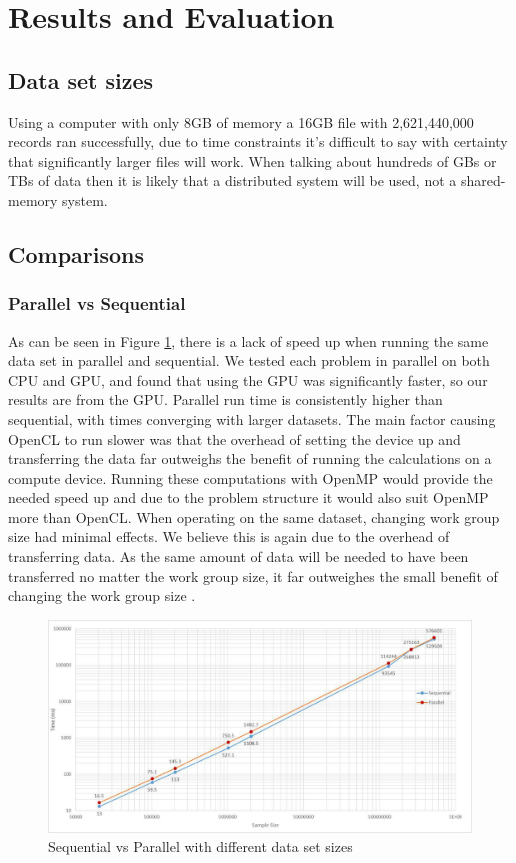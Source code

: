 
\section{Results and Evaluation}


\subsection{Data set sizes}
Using a computer with only 8GB of memory a 16GB file with 2,621,440,000 records ran successfully, due to time constraints it's difficult to say with certainty that significantly larger files will work. When talking about hundreds of GBs or TBs of data then it is likely that a distributed system will be used, not a shared-memory system.

\subsection{Comparisons}

\subsubsection{Parallel vs Sequential}
As can be seen in Figure \ref{speedup}, there is a lack of speed up when running the same data set in parallel and sequential. We tested each problem in parallel on both CPU and GPU, and found that using the GPU was significantly faster, so our results are from the GPU. Parallel run time is consistently higher than sequential, with times converging with larger datasets. The main factor causing OpenCL to run slower was that the overhead of setting the device up and transferring the data far outweighs the benefit of running the calculations on a compute device. Running these computations with OpenMP would provide the needed speed up and due to the problem structure it would also suit OpenMP more than OpenCL. When operating on the same dataset, changing work group size had minimal effects. We believe this is again due to the overhead of transferring data. As the same amount of data will be needed to have been transferred no matter the work group size, it far outweighes the small benefit of changing the work group size \cite{Karimi2015}. 


\begin{figure}[H] \label{speedup}
\includegraphics[width=\linewidth]{images/big-graph.jpg}
\caption{Sequential vs Parallel with different data set sizes}
\end{figure}

